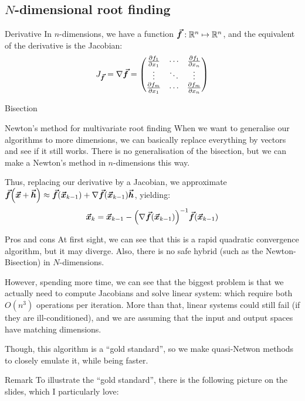 \documentclass[a4paper]{article}
\begin{document}
\subsection{$N$-dimensional root finding}
\begin{parag}{Derivative}
    In $n$-dimensions, we have a function $\bm{\protect\vec{f}}: \mathbb{R}^n \mapsto \mathbb{R}^n$, and the equivalent of the derivative is the Jacobian: 
    \[J_{\bm{\protect\vec{f}}} = \nabla \bm{\protect\vec{f}} = \begin{pmatrix} \frac{\partial f_1}{\partial x_1} & \cdots & \frac{\partial f_1}{\partial x_n} \\ \vdots & \ddots & \vdots \\ \frac{\partial f_m}{\partial x_1} & \cdots & \frac{\partial f_m}{\partial x_n} \end{pmatrix} \]
\end{parag}

\begin{parag}{Bisection}
\end{parag}

\begin{parag}{Newton's method for multivariate root finding}
    When we want to generalise our algorithms to more dimensions, we can basically replace everything by vectors and see if it still works. There is no generalisation of the bisection, but we can make a Newton's method in $n$-dimensions this way.

    Thus, replacing our derivative by a Jacobian, we approximate $\bvec{f}\left(\bvec{x} + \bvec{h}\right) \approx \bvec{f}\left(\bvec{x}_{k-1}\right) + \nabla \bvec{f}\left(\bvec{x}_{k-1}\right)\bvec{h}$, yielding: 
    \[\bvec{x}_k = \bvec{x}_{k-1} - \left(\nabla \bvec{f}\left(\bvec{x}_{k-1}\right)\right)^{-1} \bvec{f}\left(\bvec{x}_{k-1}\right)\]
    
    \begin{subparag}{Pros and cons}
        At first sight, we can see that this is a rapid quadratic convergence algorithm, but it may diverge. Also, there is no safe hybrid (such as the Newton-Bisection) in $N$-dimensions.

        However, spending more time, we can see that the biggest problem is that we actually need to compute Jacobians and solve linear system: which require both $O\left(n^3\right)$ operations per iteration. More than that, linear systems could still fail (if they are ill-conditioned), and we are assuming that the input and output spaces have matching dimensions.

        Though, this algorithm is a ``gold standard'', so we make quasi-Netwon methods to closely emulate it, while being faster.
    \end{subparag}

    \begin{subparag}{Remark}
        To illustrate the ``gold standard'', there is the following picture on the slides, which I particularly love:
    \end{subparag}
\end{parag}
\end{document}
